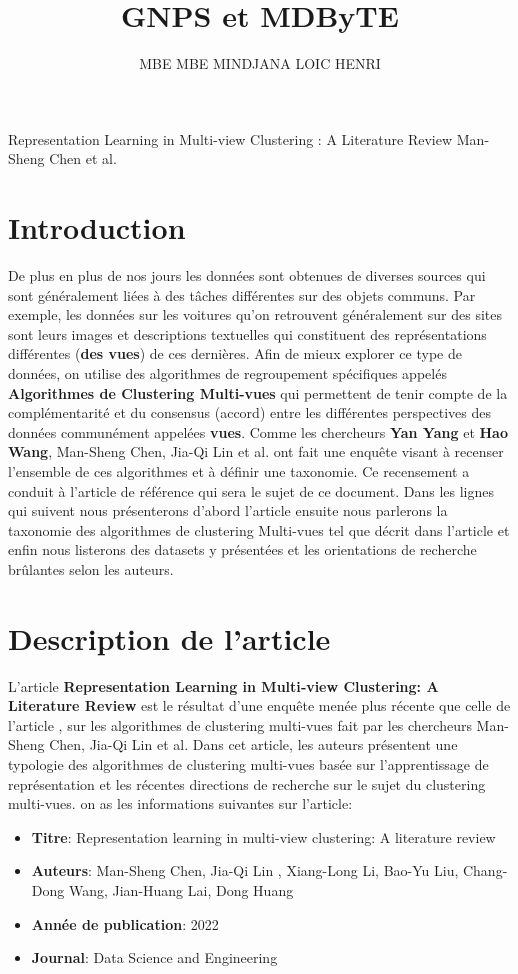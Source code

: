\documentclass[12pt, french, latin.medieval, a4paper]{report}
\author{MBE MBE MINDJANA LOIC HENRI}
\title{GNPS et MDByTE}
\begin{document}
    
    \pagecouverture
    {Representation Learning in Multi-view Clustering : A Literature Review}
    {Man-Sheng Chen et al.}
    \tableofcontents
    \vspace{20cm}
    
    \section{Introduction}
    De plus en plus de nos jours les données sont obtenues de diverses sources qui sont généralement liées à des tâches différentes sur des objets communs. Par exemple, les données sur les voitures qu'on retrouvent généralement sur des sites sont leurs images et descriptions textuelles qui constituent des représentations différentes (\textbf{des vues}) de ces dernières. Afin de mieux explorer ce type de données, on utilise des algorithmes de regroupement spécifiques appelés \textbf{Algorithmes de Clustering Multi-vues} qui permettent de tenir compte de la complémentarité et du consensus (accord) entre les différentes perspectives des données communément appelées \textbf{vues}. Comme les chercheurs \textbf{Yan Yang} et \textbf{Hao Wang}, Man-Sheng Chen, Jia-Qi Lin et al. ont fait une enquête visant à recenser l'ensemble de ces algorithmes et à définir une taxonomie. Ce recensement a conduit à l'article de référence \cite{chen2022representation} qui sera le sujet de ce document. Dans les lignes qui suivent nous présenterons d'abord l'article ensuite nous parlerons la taxonomie des algorithmes de clustering Multi-vues tel que décrit dans l'article et enfin nous listerons des datasets y présentées et les orientations de recherche brûlantes selon les auteurs.
    
    \section{Description de l'article}
	L'article \textbf{Representation Learning in Multi‑view Clustering: A Literature Review} \cite{chen2022representation} est le résultat d'une enquête menée plus récente que celle de l'article \cite{yang2018multi}, sur les algorithmes de clustering multi-vues fait par les chercheurs Man-Sheng Chen, Jia-Qi Lin et al. Dans cet article, les auteurs présentent une typologie des algorithmes de clustering multi-vues basée sur l'apprentissage de représentation et les récentes directions de recherche sur le sujet du clustering multi-vues. on as les informations suivantes sur l’article:
	\begin{itemize}
    	\item \textbf{Titre}: Representation learning in multi-view clustering: A literature review
    	\item \textbf{Auteurs}:  Man-Sheng Chen, Jia-Qi Lin , Xiang-Long Li, Bao-Yu Liu, Chang-Dong Wang, Jian-Huang Lai, Dong Huang
    	\item \textbf{Année de publication}: 2022
    	\item \textbf{Journal}: Data Science and Engineering
	\end{itemize}
\end{document}
